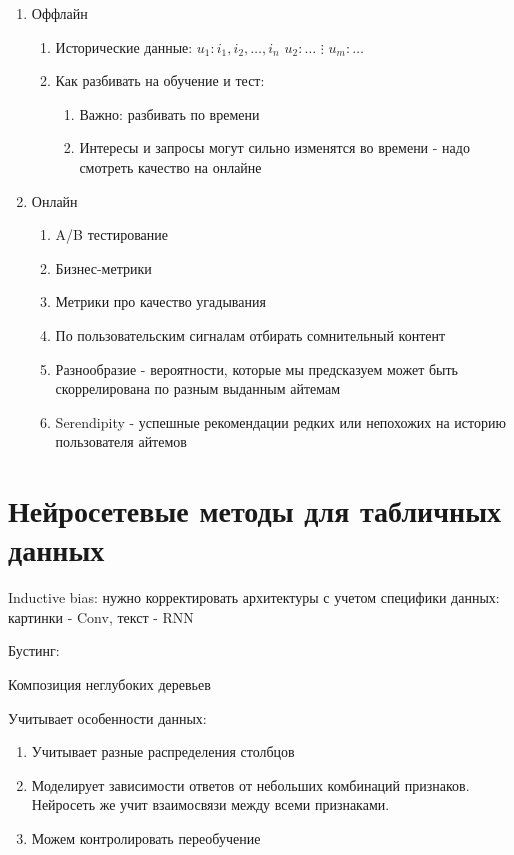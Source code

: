 \documentclass[a4paper, 12pt]{article}
\begin{document}
\begin{enumerate}
    \item Оффлайн
    \begin{enumerate}
        \item Исторические данные: 
        $u_1: i_1, i_2, \dots, i_n$
        $u_2: \dots$
        $\vdots$
        $u_m: \dots$
    \item Как разбивать на обучение и тест:
    \begin{enumerate}
        \item Важно: разбивать по времени
        \item Интересы и запросы могут сильно изменятся во времени - 
        надо смотреть качество на онлайне
    \end{enumerate}
    \end{enumerate}
    \item Онлайн
    \begin{enumerate}
        \item A/B тестирование
        \item Бизнес-метрики
        \item Метрики про качество угадывания
        \item По пользовательским сигналам отбирать сомнительный контент
        \item Разнообразие - вероятности, 
        которые мы предсказуем может быть скоррелирована 
        по разным выданным айтемам
        \item Serendipity - успешные рекомендации редких или 
        непохожих на историю пользователя айтемов
    \end{enumerate}
\end{enumerate}

\section{Нейросетевые методы для табличных данных}

Inductive bias: нужно корректировать архитектуры с учетом специфики данных:
картинки - Conv, текст - RNN

Бустинг:

Композиция неглубоких деревьев

Учитывает особенности данных:

\begin{enumerate}
    \item Учитывает разные распределения столбцов
    \item Моделирует зависимости ответов от небольших комбинаций признаков.
    Нейросеть же учит взаимосвязи между всеми признаками.
    \item Можем контролировать переобучение
\end{enumerate}
\end{document}
